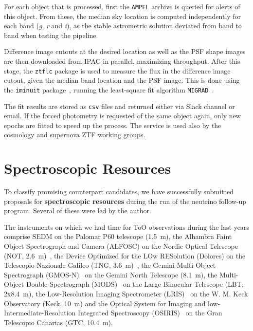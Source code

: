 For each object that is processed, first the \texttt{AMPEL} archive is queried for alerts of this object. From these, the median sky location is computed independently for each band (\textit{g}, \textit{r} and \textit{i}), as the stable astrometric solution deviated from band to band when testing the pipeline.

Difference image cutouts at the desired location as well as the PSF shape images are then downloaded from IPAC in parallel, maximizing throughput. After this stage, the \texttt{ztflc} package is used to measure the flux in the difference image cutout, given the median band location and the PSF image. This is done using the \texttt{iminuit} package~, running the least-square fit algorithm \texttt{MIGRAD}~.

The fit results are stored as \texttt{csv} files and returned either via Slack channel or email. If the forced photometry is requested of the same object again, only new epochs are fitted to speed up the process. The service is used also by the cosmology and supernova ZTF working groups.

\section{Spectroscopic Resources}\label{spec_resources}
To classify promising counterpart candidates, we have successfully submitted proposals for \textbf{spectroscopic resources} during the run of the neutrino follow-up program. Several of these were led by the author.

The instruments on which we had time for ToO observations during the last years comprise SEDM on the Palomar P60 telescope (\SI{1.5}{\meter}), the Alhambra Faint Object Spectrograph and Camera (ALFOSC) on the Nordic Optical Telescope (NOT, \SI{2.6}{\meter})~, the Device Optimized for the LOw RESolution (Dolores) on the Telescopio Nazionale Galileo (TNG, \SI{3.6}{\meter})~, the Gemini Multi-Object Spectrograph (GMOS-N)~ on the Gemini North Telescope (\SI{8.1}{\meter}), the Multi-Object Double Spectrograph (MODS)~ on the Large Binocular Telescope (LBT, 2x\SI{8.4}{\meter}), the Low-Resolution Imaging Spectrometer (LRIS)~ on the W. M. Keck Observatory (Keck, \SI{10}{\meter}) and the Optical System for Imaging and low-Intermediate-Resolution Integrated Spectroscopy (OSIRIS)~ on the Gran Telescopio Canarias (GTC, \SI{10.4}{\meter}).

